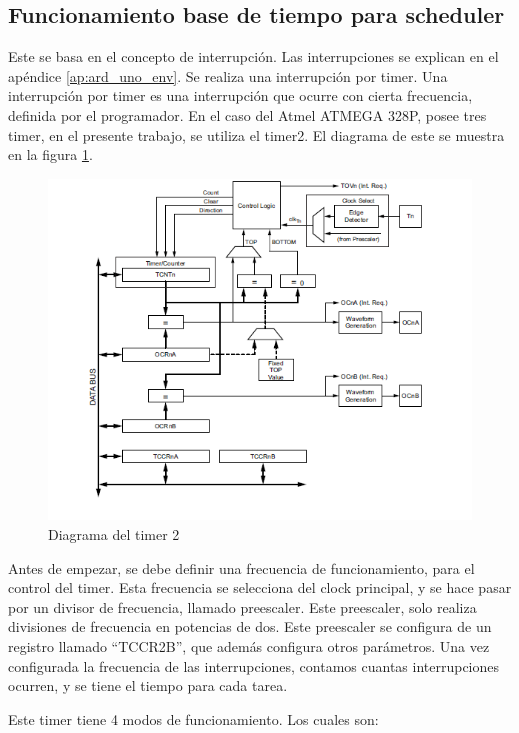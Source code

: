 \subsection{Funcionamiento base de tiempo para scheduler}

Este se basa en el concepto de interrupción. Las interrupciones se explican en el apéndice \ref{ap:ard_uno_env}. Se realiza una interrupción por timer. Una interrupción por timer es una interrupción que ocurre con cierta frecuencia, definida por el programador. En el caso del Atmel ATMEGA 328P, posee tres timer, en el presente trabajo, se utiliza el timer2. El diagrama de este se muestra en la figura \ref{fig:timer_2}. 

\begin{figure}[ht]
	\includegraphics{timer_2}
	\caption{Diagrama del timer 2 }
	\label{fig:timer_2}
\end{figure}


Antes de empezar, se debe definir una frecuencia de funcionamiento, para el control del timer. Esta frecuencia se selecciona del clock principal, y se hace pasar por un divisor de frecuencia, llamado preescaler. Este preescaler, solo realiza divisiones de frecuencia en potencias de dos. Este preescaler se configura de un registro llamado ``TCCR2B'', que además configura otros parámetros. Una vez configurada la frecuencia de las interrupciones, contamos cuantas interrupciones ocurren, y se tiene el tiempo para cada tarea. 

Este timer tiene 4 modos de funcionamiento. Los cuales son:  

